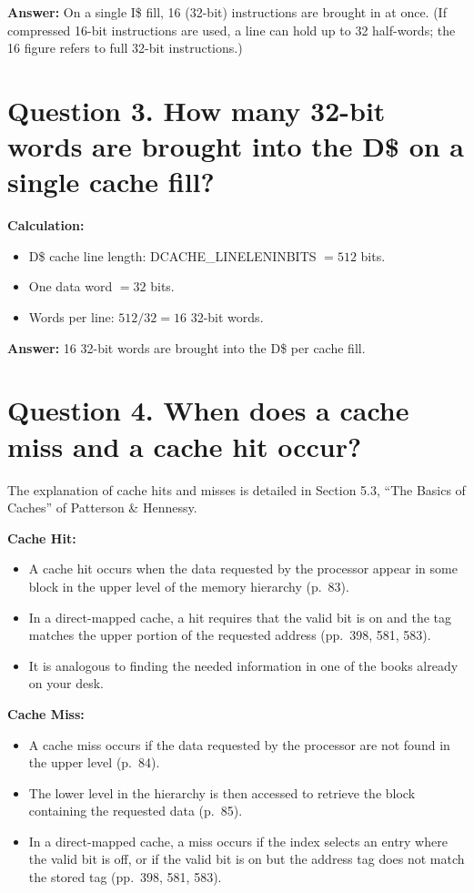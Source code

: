 \documentclass[11pt]{article}
\begin{document}
\textbf{Answer:}
On a single I\$ fill, 16 (32-bit) instructions are brought in at once.
(If compressed 16-bit instructions are used, a line can hold up to 32 half-words; the 16 figure refers to full 32-bit instructions.)

\section*{Question 3. How many 32-bit words are brought into the D\$ on a single cache fill?}

\textbf{Calculation:}
\begin{itemize}
  \item D\$ cache line length: DCACHE\_LINELENINBITS $= 512$ bits.
  \item One data word $= 32$ bits.
  \item Words per line: $512 / 32 = 16$ 32-bit words.
\end{itemize}

\textbf{Answer:}
16 32-bit words are brought into the D\$ per cache fill.

\section*{Question 4. When does a cache miss and a cache hit occur?}

The explanation of cache hits and misses is detailed in Section 5.3, ``The Basics of Caches'' of Patterson \& Hennessy.

\textbf{Cache Hit:}
\begin{itemize}
  \item A cache hit occurs when the data requested by the processor appear in some block in the upper level of the memory hierarchy (p.~83).
  \item In a direct-mapped cache, a hit requires that the valid bit is on and the tag matches the upper portion of the requested address (pp.~398, 581, 583).
  \item It is analogous to finding the needed information in one of the books already on your desk.
\end{itemize}

\textbf{Cache Miss:}
\begin{itemize}
  \item A cache miss occurs if the data requested by the processor are not found in the upper level (p.~84).
  \item The lower level in the hierarchy is then accessed to retrieve the block containing the requested data (p.~85).
  \item In a direct-mapped cache, a miss occurs if the index selects an entry where the valid bit is off, or if the valid bit is on but the address tag does not match the stored tag (pp.~398, 581, 583).
\end{itemize}
\end{document}
